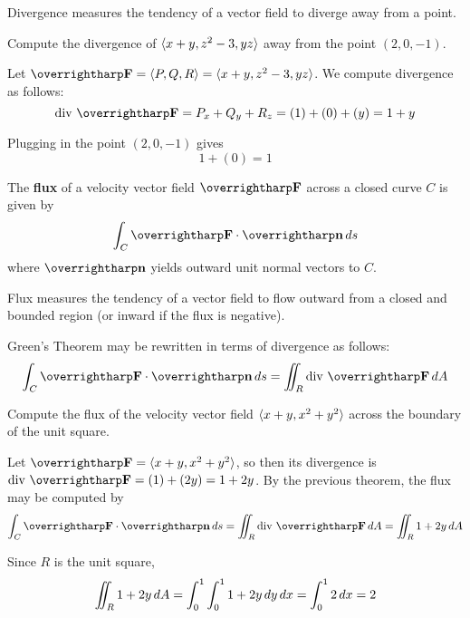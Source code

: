 \documentclass[letterpaper, twoside, 12pt]{book}
\begin{document}
\begin{remark}
  Divergence measures the tendency of a vector field to diverge away
  from a point.
\end{remark}

          \begin{problem}
            Compute the divergence of $\langle x+y,z^2-3,yz\rangle$ away from the point
            $(2,0,-1)$.
          \end{problem}

          \begin{solution}
            Let $\vect{F}=\<P,Q,R\>=\<x+y,z^2-3,yz\>$.
            We compute divergence as follows:
            \[
              \text{div }\vect{F}
                =
              P_x+Q_y+R_z
                =
              (1)+(0)+(y)
                =
              1+y
            \]

            Plugging in the point $(2,0,-1)$ gives
            \[
              1+(0) = 1
            \]
          \end{solution}

\begin{definition}
  The \textbf{flux} of a velocity vector field $\vect{F}$ across a closed
  curve $C$ is given by
  \[
    \int_C \vect{F}\cdot\vect{n}\dvar{s}
  \]
  where $\vect n$ yields outward unit normal vectors to $C$.
\end{definition}

\begin{remark}
  Flux measures the tendency of a vector field to flow outward from
  a closed and bounded region (or inward if the flux is negative).
\end{remark}

\begin{theorem}
  Green's Theorem may be rewritten in terms of divergence as follows:
  \[
    \int_C \vect{F}\cdot\vect{n}\dvar{s}
      =
    \iint_R \text{div }\vect{F} \dvar{A}
  \]
\end{theorem}

          \begin{problem}
            Compute the flux of the velocity vector field
            $\langle x+y,x^2+y^2\rangle$ across the boundary of the unit square.
          \end{problem}

          \begin{solution}
            Let $\vect{F}=\<x+y,x^2+y^2\>$, so then its divergence is
            $\text{div }\vect{F}=(1)+(2y)=1+2y$.
            By the previous theorem, the flux may be computed by
            \[
              \int_C \vect{F}\cdot\vect{n}\dvar{s}
                =
              \iint_R \text{div }\vect{F} \dvar{A}
                =
              \iint_R 1+2y \dvar{A}
            \]

            Since $R$ is the unit square,
            \[
              \iint_R 1+2y \,d{A}
                =
              \int_0^1\int_0^1 1+2y \,d{y}\,d{x}
                =
              \int_0^1 2\,d{x}
                =
              2
            \]
          \end{solution}
\end{document}
